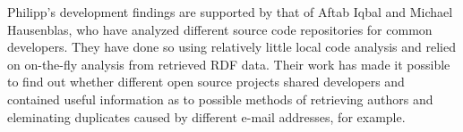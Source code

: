 Philipp's development findings are supported by that of
Aftab Iqbal and Michael Hausenblas, who have analyzed different
source code repositories for common developers\cite{ih:2012}.
They have done so using relatively little local code analysis and relied
on on-the-fly analysis from retrieved RDF data. Their work
has made it possible to find out whether different open source projects shared developers
and contained useful information as to possible methods of retrieving authors
and eleminating duplicates caused by different e-mail addresses, for example.